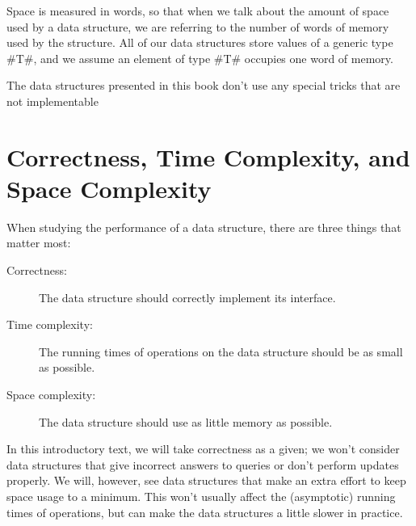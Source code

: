 {{{{{{{{{Space is measured in words, so that when we talk about the amount of space used by a data structure, we are referring to the number of words of memory used by the structure.  All of our data structures store values of a generic type #T#, and we assume an element of type #T# occupies one word of memory.  

 The data structures presented in this book don't use any special tricks that are not implementable  
\section{Correctness, Time Complexity, and Space Complexity}

When studying the performance of a data structure, there are three things that matter most:

\begin{description}
  \item[Correctness:] The data structure should correctly implement
    its interface.
  \item[Time complexity:] The running times of operations on the data
    structure should be as small as possible.
  \item[Space complexity:] The data structure should use as little memory
    as possible.
\end{description}


In this introductory text, we will take correctness as a given;  we won't consider data structures that give incorrect answers to queries or don't perform updates properly.  We will, however, see data structures that make an extra effort to keep space usage to a minimum.  This won't usually affect the (asymptotic) running times of operations, but can make the data structures a little slower in practice.

}}}}}}}}}
